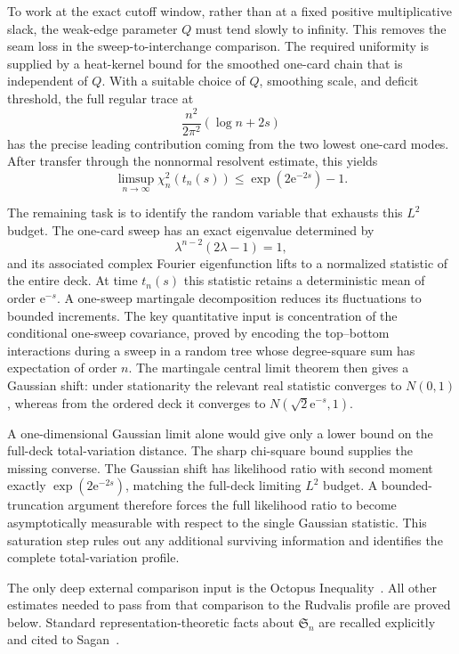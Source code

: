 \documentclass[11pt]{article}
\theoremstyle{remark}
\newcommand{\Sn}{\mathfrak S_n}
\newcommand{\ee}{\mathrm e}
\begin{document}
To work at the exact cutoff window, rather than at a fixed positive multiplicative slack, the weak-edge parameter $Q$ must tend slowly to infinity.  This removes the seam loss in the sweep-to-interchange comparison.  The required uniformity is supplied by a heat-kernel bound for the smoothed one-card chain that is independent of $Q$.  With a suitable choice of $Q$, smoothing scale, and deficit threshold, the full regular trace at
\[
 \frac{n^2}{2\pi^2}(\log n+2s)
\]
has the precise leading contribution coming from the two lowest one-card modes.  After transfer through the nonnormal resolvent estimate, this yields
\[
 \limsup_{n\to\infty}\chi_n^2(t_n(s))
 \le \exp(2\ee^{-2s})-1.
\]

The remaining task is to identify the random variable that exhausts this $L^2$ budget.  The one-card sweep has an exact eigenvalue determined by
\[
 \lambda^{n-2}(2\lambda-1)=1,
\]
and its associated complex Fourier eigenfunction lifts to a normalized statistic of the entire deck.  At time $t_n(s)$ this statistic retains a deterministic mean of order $\ee^{-s}$.  A one-sweep martingale decomposition reduces its fluctuations to bounded increments.  The key quantitative input is concentration of the conditional one-sweep covariance, proved by encoding the top--bottom interactions during a sweep in a random tree whose degree-square sum has expectation of order $n$.  The martingale central limit theorem then gives a Gaussian shift: under stationarity the relevant real statistic converges to $N(0,1)$, whereas from the ordered deck it converges to $N(\sqrt2\ee^{-s},1)$.

A one-dimensional Gaussian limit alone would give only a lower bound on the full-deck total-variation distance.  The sharp chi-square bound supplies the missing converse.  The Gaussian shift has likelihood ratio with second moment exactly $\exp(2\ee^{-2s})$, matching the full-deck limiting $L^2$ budget.  A bounded-truncation argument therefore forces the full likelihood ratio to become asymptotically measurable with respect to the single Gaussian statistic.  This saturation step rules out any additional surviving information and identifies the complete total-variation profile.

The only deep external comparison input is the Octopus Inequality~\cite{CLR}.  All other estimates needed to pass from that comparison to the Rudvalis profile are proved below.  Standard representation-theoretic facts about $\Sn$ are recalled explicitly and cited to Sagan~\cite{Sagan}.
\end{document}
